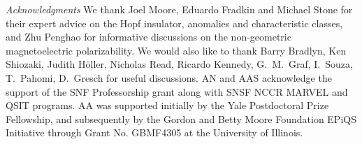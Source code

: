 \documentclass[aps,prl,showpacs,twocolumn,superscriptaddress]{revtex4-1}
\begin{document}









\begin{acknowledgments}
\noindent \textit{Acknowledgments} We thank Joel Moore, Eduardo Fradkin and Michael Stone for their expert advice on the Hopf insulator, anomalies and characteristic classes, and Zhu Penghao for informative discussions on the non-geometric magnetoelectric polarizability. We would also like to thank Barry Bradlyn, Ken Shiozaki, Judith H\"oller, Nicholas Read, Ricardo Kennedy, G.~M.~Graf, I.~Souza, T.~Pahomi, D.~Gresch for useful discussions. AN and AAS acknowledge the support of the SNF Professorship grant along with SNSF NCCR MARVEL and QSIT programs.  AA was supported initially by the Yale Postdoctoral Prize Fellowship, and subsequently by the Gordon and Betty Moore Foundation EPiQS Initiative through Grant No. GBMF4305 at the University of Illinois. 
\end{acknowledgments}
 

\end{document}

